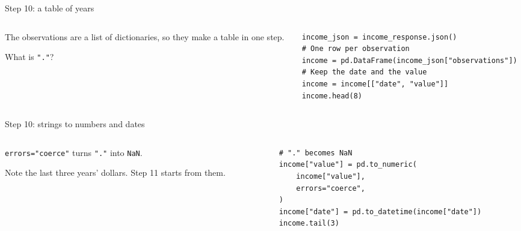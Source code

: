 \documentclass[9pt,aspectratio=169]{beamer}
\begin{document}
\begin{frame}[fragile]{Step 10: a table of years}
    \begin{columns}[T]
        \begin{column}{0.37\textwidth}
            The observations are a list of dictionaries, so they make a table in one step.

            \medskip
            What is \texttt{"."}?
        \end{column}
        \begin{column}{0.6\textwidth}
\begin{lstlisting}
income_json = income_response.json()
# One row per observation
income = pd.DataFrame(income_json["observations"])
# Keep the date and the value
income = income[["date", "value"]]
income.head(8)
\end{lstlisting}
        \end{column}
    \end{columns}
\end{frame}

\begin{frame}[fragile]{Step 10: strings to numbers and dates}
    \begin{columns}[T]
        \begin{column}{0.37\textwidth}
            \texttt{errors="coerce"} turns \texttt{"."} into \texttt{NaN}.

            \medskip
            Note the last three years' dollars. Step 11 starts from them.
        \end{column}
        \begin{column}{0.6\textwidth}
\begin{lstlisting}
# "." becomes NaN
income["value"] = pd.to_numeric(
    income["value"],
    errors="coerce",
)
income["date"] = pd.to_datetime(income["date"])
income.tail(3)
\end{lstlisting}
        \end{column}
    \end{columns}
\end{frame}
\end{document}
